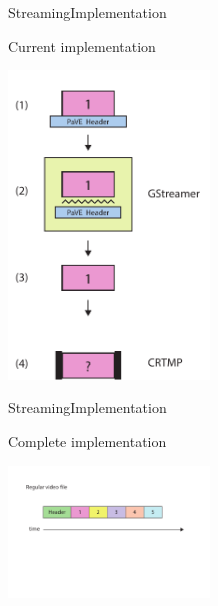\begin{frame}{Streaming}{Implementation}
  \begin{block}{Current implementation}
    \begin{center}
      \includegraphics[width=0.4\textwidth]{images/stream_what_we_did.pdf}
    \end{center}
  \end{block}
\end{frame}

\begin{frame}{Streaming}{Implementation}
  \begin{block}{Complete implementation}
    \begin{center}
      \includegraphics[width=0.4\textwidth]{images/stream_what_we_should_have_done.pdf}
    \end{center}
  \end{block}
\end{frame}